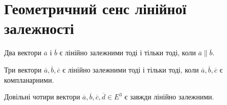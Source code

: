 \section*{Геометричний сенс лінійної залежності}

\begin{claim}
	Два вектори $\overline{a}$ і $\overline{b}$ є лінійно залежними тоді і тільки тоді, коли $\overline{a} \parallel \overline{b}$.
\end{claim}

\begin{claim}
	Три вектори $\overline{a}, \overline{b}, \overline{c}$ є лінійно залежними тоді і тільки тоді, коли $\overline{a}, \overline{b}, \overline{c}$ є компланарними. 
\end{claim}

\begin{claim}
	Довільні чотири вектори $\overline{a}, \overline{b}, \overline{c}, \overline{d} \in E^3$ є завжди лінійно залежними.
\end{claim}






